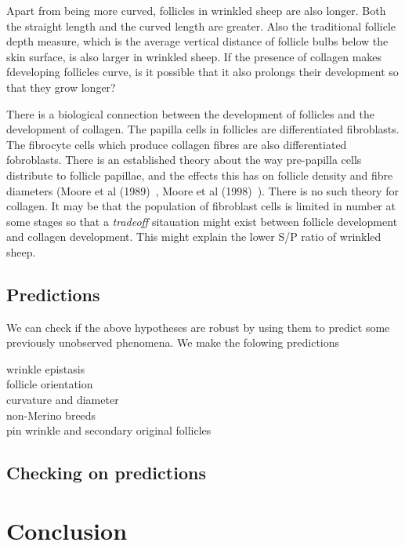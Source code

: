 \documentclass[titlepage]{article}  %
\begin{document}
Apart from being more curved, follicles in wrinkled sheep are also longer. Both the straight length and the curved length are greater. Also the traditional follicle depth measure, which is the average vertical distance of follicle bulbs below the skin surface, is also larger in wrinkled sheep.  If the presence of collagen makes fdeveloping follicles curve, is it possible that it also prolongs their development so that they grow longer? 

There is a biological connection between the development of follicles and the development of collagen. The papilla cells in follicles are differentiated fibroblasts. The fibrocyte cells which produce collagen fibres are also differentiated fobroblasts.  There is an established theory about the way pre-papilla cells distribute to follicle papillae, and the effects this has on follicle density and fibre diameters (Moore et al (1989)~\cite{moor:89}, Moore et al (1998)~\cite{moor:98}). There is no such theory for collagen. It may be that the population of fibroblast cells is limited in number at some stages so that a {\em tradeoff} sitauation might exist between follicle development and collagen development. This might explain the lower S/P ratio of wrinkled sheep.

\subsection{Predictions}
We can check if the above hypotheses are robust by using them to predict some previously unobserved phenomena. We make the folowing predictions
\begin{description}
\item[wrinkle epistasis]
\item[follicle orientation]
\item[curvature and diameter]
\item[non-Merino breeds]
\item[pin wrinkle and secondary original follicles]
\end{description}

\subsection{Checking on predictions}

\section{Conclusion}
\end{document}
